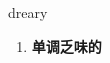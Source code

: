 
\begin{frame}
{\huge dreary}
\begin{center}
\begin{enumerate}\Large
  \item \textbf{单调乏味的}
\end{enumerate}
\end{center}
\end{frame}
